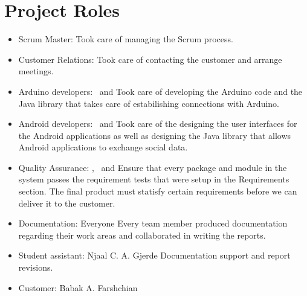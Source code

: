 \section{Project Roles}
\begin{itemize}
	\item{Scrum Master:} \henrik\newline
	Took care of managing the Scrum process.
	
	\item{Customer Relations:} \henrik\newline
	Took care of contacting the customer and arrange meetings.

	\item{Arduino developers:} \anders~and \bjornar\newline
	Took care of developing the Arduino code and the Java library that takes
	care of estabilishing connections with Arduino.

	\item{Android developers:} \emanuele~and \henrik\newline
	Took care of the designing the user interfaces for the Android applications
	as well as designing the Java library that allows Android applications
	to exchange social data.
	
	\item{Quality Assurance:} \johan, \asbjorn~and \jonas\newline
	Ensure that every package and module in the system passes the requirement tests
	that were setup in the Requirements section. The final product must statisfy certain
	requirements before we can deliver it to the customer.

	\item{Documentation:} Everyone\newline
	Every team member produced documentation regarding their work areas and
	collaborated in writing the reports.

	\item{Student assistant:} Njaal C. A. Gjerde\newline
	Documentation support and report revisions.

	\item{Customer:} Babak A. Farshchian
\end{itemize}

\newpage


